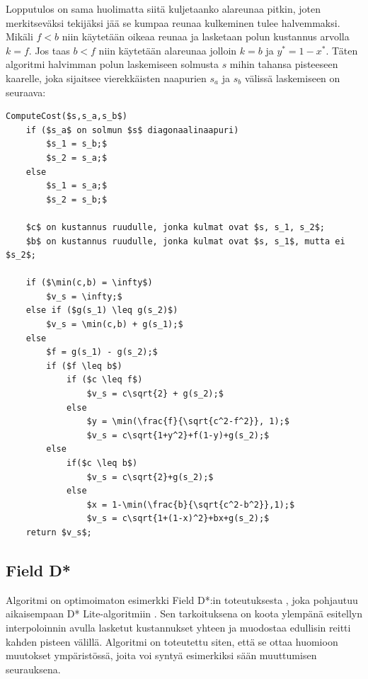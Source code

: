 \documentclass[finnish]{tktltiki2}
\theoremstyle{definition}
\theoremstyle{remark}
\begin{document}
Lopputulos on sama huolimatta siitä kuljetaanko alareunaa pitkin, joten merkitseväksi tekijäksi jää se kumpaa reunaa kulkeminen tulee halvemmaksi. Mikäli \(f < b\) niin käytetään oikeaa reunaa ja lasketaan polun kustannus arvolla \(k = f\). Jos taas \(b < f\) niin käytetään alareunaa jolloin \(k = b\) ja \(y^* = 1 - x^*\). Täten algoritmi halvimman polun laskemiseen solmusta \(s\) mihin tahansa pisteeseen kaarelle, joka sijaitsee vierekkäisten naapurien \(s_a\) ja \(s_b\) välissä laskemiseen on seuraava:

\lstset{basicstyle=\footnotesize, tabsize=4}
\begin{lstlisting}[mathescape=true]
ComputeCost($s,s_a,s_b$)
	if ($s_a$ on solmun $s$ diagonaalinaapuri)
		$s_1 = s_b;$
		$s_2 = s_a;$
	else
		$s_1 = s_a;$
		$s_2 = s_b;$

	$c$ on kustannus ruudulle, jonka kulmat ovat $s, s_1, s_2$;
	$b$ on kustannus ruudulle, jonka kulmat ovat $s, s_1$, mutta ei $s_2$;

	if ($\min(c,b) = \infty$)
		$v_s = \infty;$
	else if ($g(s_1) \leq g(s_2)$)
		$v_s = \min(c,b) + g(s_1);$
	else
		$f = g(s_1) - g(s_2);$
		if ($f \leq b$)
			if ($c \leq f$)
				$v_s = c\sqrt{2} + g(s_2);$
			else
				$y = \min(\frac{f}{\sqrt{c^2-f^2}}, 1);$
				$v_s = c\sqrt{1+y^2}+f(1-y)+g(s_2);$
		else
			if($c \leq b$)
				$v_s = c\sqrt{2}+g(s_2);$
			else
				$x = 1-\min(\frac{b}{\sqrt{c^2-b^2}},1);$
				$v_s = c\sqrt{1+(1-x)^2}+bx+g(s_2);$
	return $v_s$;
\end{lstlisting}

\subsection{Field D*}
Algoritmi on optimoimaton esimerkki Field D*:in toteutuksesta \cite{ferguson2007field}, joka pohjautuu aikaisempaan D* Lite-algoritmiin \cite{koenig2002d}. Sen tarkoituksena on koota ylempänä esitellyn interpoloinnin avulla lasketut kustannukset yhteen ja muodostaa edullisin reitti kahden pisteen välillä. Algoritmi on toteutettu siten, että se ottaa huomioon muutokset ympäristössä, joita voi syntyä esimerkiksi sään muuttumisen seurauksena.
\end{document}
